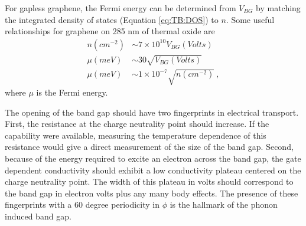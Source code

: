 For gapless graphene, the Fermi energy can be determined from $V_{BG}$ by matching the integrated density of states (Equation \ref{eq:TB:DOS}) to $n$.
Some useful relationships for graphene on 285 nm of thermal oxide are
\begin{align*}
	n(cm^{-2})&\sim 7 \times 10^{10} V_{BG} (Volts) \\
	\mu(meV) &\sim 30 \sqrt{V_{BG} (Volts)} \\
	\mu(meV) &\sim 1 \times 10^{-7} \sqrt{n(cm^{-2})} \ ,
\end{align*}
where $\mu$ is the Fermi energy.

The opening of the band gap should have two fingerprints in electrical transport.
First, the resistance at the charge neutrality point should increase.
If the capability were available, measuring the temperature dependence of this resistance would give a direct measurement of the size of the band gap.
Second, because of the energy required to excite an electron across the band gap, the gate dependent conductivity should exhibit a low conductivity plateau centered on the charge neutrality point.
The width of this plateau in volts should correspond to the band gap in electron volts plus any many body effects.
The presence of these fingerprints with a 60 degree periodicity in $\phi$ is the hallmark of the phonon induced band gap. 